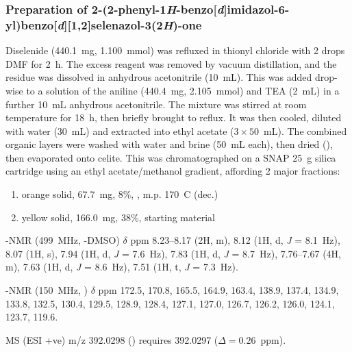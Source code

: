 \begin{refsection}
\subsubsection[Preparation of \refcmpd{ebs-rhs-ph}]{Preparation of 2-(2-phenyl-1\emph{H}-benzo[\emph{d}]imidazol-6-yl)benzo[\emph{d}][1,2]\-selenazol-3(2\emph{H})-one }
Diselenide  (440.1~mg, 1.100~mmol) was refluxed in thionyl chloride with 2 drops DMF for 2~h.
The excess reagent was removed by vacuum distillation, and the residue was dissolved in anhydrous acetonitrile (10~mL).
This was added drop-wise to a solution of the aniline  (440.4~mg, 2.105~mmol) and TEA (2~mL) in a further 10~mL anhydrous acetonitrile.
The mixture was stirred at room temperature for 18~h, then briefly brought to reflux.
It was then cooled, diluted with water (30~mL) and extracted into ethyl acetate ($3\times50$~mL).
The combined organic layers were washed with water and brine (50~mL each), then dried (), then evaporated onto celite.
This was chromatographed on a SNAP 25~g silica cartridge using an ethyl acetate/methanol gradient, affording 2 major fractions:
\begin{enumerate}
    \item orange solid, 67.7~mg, 8\%, , m.p. 170~\degree{}C (dec.)
    \item yellow solid, 166.0~mg, 38\%, starting material 
\end{enumerate}

-NMR (499~MHz, -DMSO) $\delta$ ppm 8.23--8.17 (2H, m), 8.12 (1H, d, \textit{J} = 8.1~Hz), 8.07 (1H, s), 7.94 (1H, d, \textit{J} = 7.6~Hz), 7.83 (1H, d, \textit{J} = 8.7~Hz), 7.76--7.67 (4H, m), 7.63 (1H, d, \textit{J} = 8.6~Hz), 7.51 (1H, t, \textit{J} = 7.3~Hz). %

-NMR (150~MHz, ) $\delta$ ppm 172.5, 170.8, 165.5, 164.9, 163.4, 138.9, 137.4, 134.9, 133.8, 132.5, 130.4, 129.5, 128.9, 128.4, 127.1, 127.0, 126.7, 126.2, 126.0, 124.1, 123.7, 119.6.

MS (ESI +ve) m/z 392.0298 ()  requires 392.0297 ($\Delta=0.26$~ppm).

\printbibliography[heading=subbibliography]
\end{refsection}
